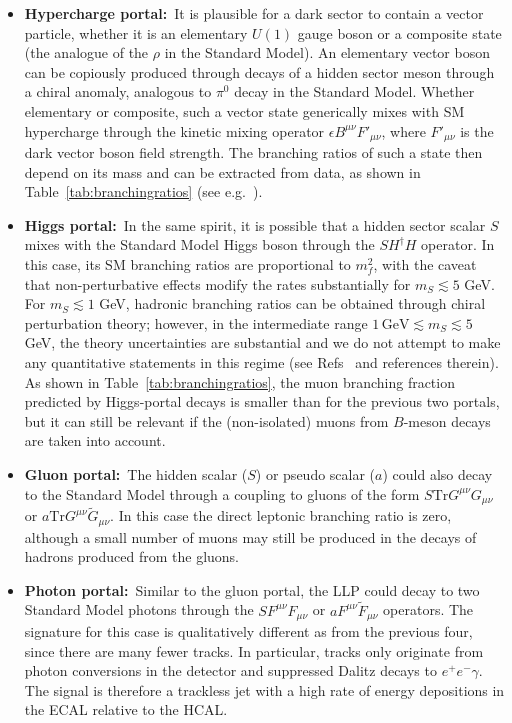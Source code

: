 \begin{enumerate}
\begin{itemize}
\item {\bf Hypercharge portal:}~It is plausible for a dark sector to contain a vector particle, whether it is an elementary $U(1)$ gauge boson or a composite state (the analogue of the $\rho$ in the Standard Model). An elementary vector boson can be  copiously produced through decays of a hidden sector meson through a chiral anomaly, analogous to $\pi^0$ decay in the Standard Model.  Whether elementary or composite, such a vector state generically mixes with SM hypercharge through the kinetic mixing operator $\epsilon B^{\mu\nu}F'_{\mu\nu}$, where $F'_{\mu\nu}$ is the dark vector boson field strength.  The branching ratios of such a state then depend on its mass and can be extracted from data, as shown in Table~\ref{tab:branchingratios} (see e.g.~\cite{Meade:2009rb, Curtin:2014cca}).

\item {\bf Higgs portal:}~In the same spirit, it is possible that a hidden sector scalar $S$ mixes with the Standard Model Higgs boson through the $S H^\dagger H$ operator. In this case, its SM branching ratios are proportional to $m_f^2$, with the caveat that non-perturbative effects modify the rates substantially for $m_S\lesssim 5$ GeV. For $m_S\lesssim 1$ GeV, hadronic branching ratios can be obtained through chiral perturbation theory; however, in the intermediate range  $1\, \mathrm{GeV} \lesssim m_S \lesssim 5$ GeV, the theory uncertainties are substantial and we do not attempt to make any quantitative statements in this regime (see Refs~\cite{Clarke:2013aya} and references therein). As shown in Table~\ref{tab:branchingratios}, the muon branching fraction predicted by Higgs-portal decays is smaller than for the previous two portals, but it can still be relevant if the (non-isolated) muons from $B$-meson decays are taken into account.

\item {\bf Gluon portal:}~The hidden scalar ($S$) or pseudo scalar ($a$) could also decay to the Standard Model through a coupling to gluons of the form $S \mathrm{Tr}G^{\mu\nu}G_{\mu\nu}$ or $a \mathrm{Tr}G^{\mu\nu}\tilde G_{\mu\nu}$. In this case the direct leptonic branching ratio is zero, although a small number of muons may still be produced in the decays of hadrons produced from the gluons.

\item {\bf Photon portal:}~Similar to the gluon portal, the LLP could decay to two Standard Model photons through the $S F^{\mu\nu}F_{\mu\nu}$ or $a F^{\mu\nu}\tilde F_{\mu\nu}$ operators. The signature for this case is qualitatively different as from the previous four, since there are many fewer tracks. In particular, tracks only originate from photon conversions in the detector and suppressed Dalitz decays to $e^+e^-\gamma$. The signal is therefore a trackless jet with a high rate of energy depositions in the ECAL relative to the HCAL.
\end{itemize}


\end{enumerate}
